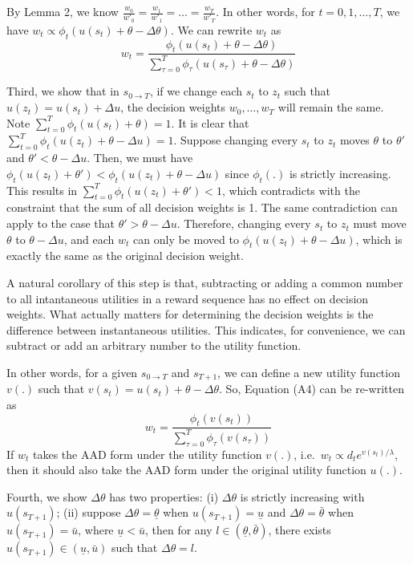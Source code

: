 By Lemma 2, we know
\(\frac{w_0}{w'_0}=\frac{w_1}{w'_1}=…=\frac{w_T}{w'_T}\). In other
words, for \(t=0,1,…,T\), we have
\(w_t \propto \phi_t(u(s_t)+\theta-\Delta \theta)\). We can rewrite
\(w_t\) as \[\tag{A4}
w_t = \frac{\phi_t(u(s_t)+\theta-\Delta \theta)}{\sum_{\tau=0}^{T}\phi_\tau(u(s_\tau)+\theta-\Delta \theta)}
\]

Third, we show that in \(s_{0\rightarrow T}\), if we change each \(s_t\)
to \(z_t\) such that \(u(z_t)=u(s_t)+\Delta u\), the decision weights
\(w_0,…,w_T\) will remain the same. Note
\(\sum_{t=0}^T \phi_t(u(s_t)+\theta)=1\). It is clear that
\(\sum_{t=0}^T \phi_t(u(z_t)+\theta-\Delta u)=1\). Suppose changing
every \(s_t\) to \(z_t\) moves \(\theta\) to \(\theta'\) and
\(\theta'<\theta-\Delta u\). Then, we must have
\(\phi_t(u(z_t)+\theta')<\phi_t(u(z_t)+\theta-\Delta u)\) since
\(\phi_t(.)\) is strictly increasing. This results in
\(\sum_{t=0}^T \phi_t(u(z_t)+\theta')<1\), which contradicts with the
constraint that the sum of all decision weights is 1. The same
contradiction can apply to the case that \(\theta'>\theta-\Delta u\).
Therefore, changing every \(s_t\) to \(z_t\) must move \(\theta\) to
\(\theta - \Delta u\), and each \(w_t\) can only be moved to
\(\phi_t(u(z_t)+\theta -\Delta u)\), which is exactly the same as the
original decision weight.

A natural corollary of this step is that, subtracting or adding a common
number to all intantaneous utilities in a reward sequence has no effect
on decision weights. What actually matters for determining the decision
weights is the difference between instantaneous utilities. This
indicates, for convenience, we can subtract or add an arbitrary number
to the utility function.

In other words, for a given \(s_{0\rightarrow T}\) and \(s_{T+1}\), we
can define a new utility function \(v(.)\) such that
\(v(s_t) = u(s_t) +\theta-\Delta \theta\). So, Equation (A4) can be
re-written as\[
w_t = \frac{\phi_t(v(s_t))}{\sum_{\tau=0}^{T}\phi_\tau(v(s_\tau))}
\]If \(w_t\) takes the AAD form under the utility function \(v(.)\),
i.e.~\(w_t \propto d_t e^{v(s_t)/\lambda}\), then it should also take
the AAD form under the original utility function \(u(.)\).

Fourth, we show \(\Delta \theta\) has two properties: (i)
\(\Delta \theta\) is strictly increasing with \(u(s_{T+1})\); (ii)
suppose \(\Delta \theta = \underline{\theta}\) when
\(u(s_{T+1})=\underline{u}\) and \(\Delta\theta=\bar{\theta}\) when
\(u(s_{T+1})=\bar{u}\), where \(\underline{u}<\bar{u}\), then for any
\(l \in(\underline{\theta},\bar{\theta})\), there exists
\(u(s_{T+1})\in(\underline{u},\bar{u})\) such that
\(\Delta \theta = l\).

